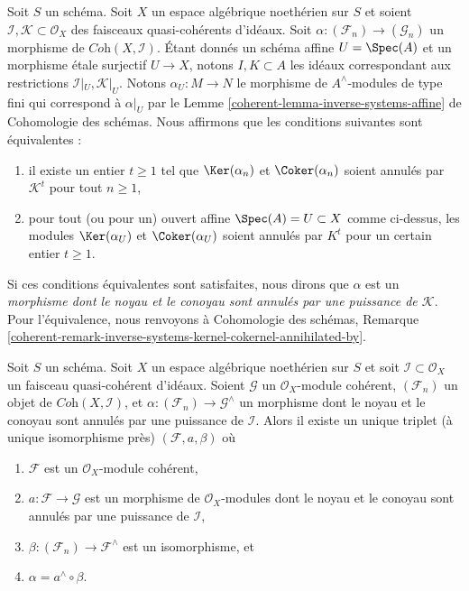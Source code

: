 \begin{remark}
\label{remark-inverse-systems-kernel-cokernel-annihilated-by}
Soit $S$ un schéma. Soit $X$ un espace algébrique noethérien sur $S$ et soient
$\mathcal{I}, \mathcal{K} \subset \mathcal{O}_X$ des faisceaux quasi-cohérents
d'idéaux. Soit $\alpha : (\mathcal{F}_n) \to (\mathcal{G}_n)$ un morphisme de
$\textit{Coh}(X, \mathcal{I})$.
Étant donnés un schéma affine $U = \Spec(A)$ et un morphisme étale surjectif
$U \to X$, notons $I, K \subset A$ les idéaux correspondant aux restrictions
$\mathcal{I}|_U, \mathcal{K}|_U$. Notons $\alpha_U : M \to N$ le morphisme de
$A^\wedge$-modules de type fini qui correspond à $\alpha|_U$ par le
Lemme \ref{coherent-lemma-inverse-systems-affine} de Cohomologie des schémas.
Nous affirmons que les conditions suivantes sont équivalentes :
\begin{enumerate}
\item il existe un entier $t \geq 1$ tel que
$\Ker(\alpha_n)$ et $\Coker(\alpha_n)$
soient annulés par $\mathcal{K}^t$ pour tout $n \geq 1$,
\item pour tout (ou pour un) ouvert affine $\Spec(A) = U \subset X$ comme ci-dessus,
les modules $\Ker(\alpha_U)$ et $\Coker(\alpha_U)$
soient annulés par $K^t$ pour un certain entier $t \geq 1$.
\end{enumerate}
Si ces conditions équivalentes sont satisfaites, nous dirons que $\alpha$ est un
{\it morphisme dont le noyau et le conoyau sont annulés par une puissance de
$\mathcal{K}$}. Pour l'équivalence, nous renvoyons à
Cohomologie des schémas, Remarque
\ref{coherent-remark-inverse-systems-kernel-cokernel-annihilated-by}.
\end{remark}

\begin{lemma}
\label{lemma-existence-easy}
Soit $S$ un schéma. Soit $X$ un espace algébrique noethérien sur $S$ et soit
$\mathcal{I} \subset \mathcal{O}_X$ un faisceau quasi-cohérent d'idéaux.
Soient $\mathcal{G}$ un $\mathcal{O}_X$-module cohérent, $(\mathcal{F}_n)$
un objet de $\textit{Coh}(X, \mathcal{I})$, et
$\alpha : (\mathcal{F}_n) \to \mathcal{G}^\wedge$
un morphisme dont le noyau et le conoyau sont annulés par une puissance de $\mathcal{I}$.
Alors il existe un unique triplet (à unique isomorphisme près)
$(\mathcal{F}, a, \beta)$ où
\begin{enumerate}
\item $\mathcal{F}$ est un $\mathcal{O}_X$-module cohérent,
\item $a : \mathcal{F} \to \mathcal{G}$ est un morphisme de $\mathcal{O}_X$-modules
dont le noyau et le conoyau sont annulés par une puissance de $\mathcal{I}$,
\item $\beta : (\mathcal{F}_n) \to \mathcal{F}^\wedge$ est un isomorphisme, et
\item $\alpha = a^\wedge \circ \beta$.
\end{enumerate}
\end{lemma}

